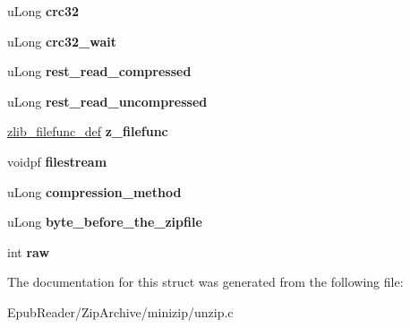 \begin{DoxyCompactItemize}
\item 
\hypertarget{structfile__in__zip__read__info__s_a9d7e4dc6f312fb59bf8e60fb952f4d68}{u\-Long {\bfseries crc32}}\label{structfile__in__zip__read__info__s_a9d7e4dc6f312fb59bf8e60fb952f4d68}

\item 
\hypertarget{structfile__in__zip__read__info__s_a6120c521be40e8ba530249f0c766ab9d}{u\-Long {\bfseries crc32\-\_\-wait}}\label{structfile__in__zip__read__info__s_a6120c521be40e8ba530249f0c766ab9d}

\item 
\hypertarget{structfile__in__zip__read__info__s_a4c7b8e6502f7195feefd676dff0bb494}{u\-Long {\bfseries rest\-\_\-read\-\_\-compressed}}\label{structfile__in__zip__read__info__s_a4c7b8e6502f7195feefd676dff0bb494}

\item 
\hypertarget{structfile__in__zip__read__info__s_a8e3801645cfa5bfd147fd8d037fcf9a5}{u\-Long {\bfseries rest\-\_\-read\-\_\-uncompressed}}\label{structfile__in__zip__read__info__s_a8e3801645cfa5bfd147fd8d037fcf9a5}

\item 
\hypertarget{structfile__in__zip__read__info__s_a5eae7e8fffe8d7e9e7271ce2206283e7}{\hyperlink{structzlib__filefunc__def__s}{zlib\-\_\-filefunc\-\_\-def} {\bfseries z\-\_\-filefunc}}\label{structfile__in__zip__read__info__s_a5eae7e8fffe8d7e9e7271ce2206283e7}

\item 
\hypertarget{structfile__in__zip__read__info__s_ab0b66746406599abe4528b7b48961bba}{voidpf {\bfseries filestream}}\label{structfile__in__zip__read__info__s_ab0b66746406599abe4528b7b48961bba}

\item 
\hypertarget{structfile__in__zip__read__info__s_a86cbaa96568192cae9ab9cd606963fdb}{u\-Long {\bfseries compression\-\_\-method}}\label{structfile__in__zip__read__info__s_a86cbaa96568192cae9ab9cd606963fdb}

\item 
\hypertarget{structfile__in__zip__read__info__s_a52c8e657a1238a3b9fa87b4167d9b7a3}{u\-Long {\bfseries byte\-\_\-before\-\_\-the\-\_\-zipfile}}\label{structfile__in__zip__read__info__s_a52c8e657a1238a3b9fa87b4167d9b7a3}

\item 
\hypertarget{structfile__in__zip__read__info__s_aec0649000ce059ef1262b5a5be1641fe}{int {\bfseries raw}}\label{structfile__in__zip__read__info__s_aec0649000ce059ef1262b5a5be1641fe}

\end{DoxyCompactItemize}


The documentation for this struct was generated from the following file\-:\begin{DoxyCompactItemize}
\item 
Epub\-Reader/\-Zip\-Archive/minizip/unzip.\-c\end{DoxyCompactItemize}
